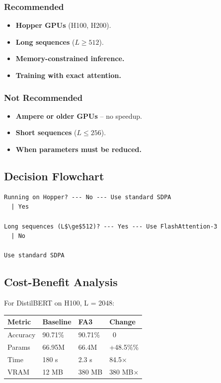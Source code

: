 \subsubsection{Recommended}
\begin{itemize}
\item \textbf{Hopper GPUs} (H100, H200).
\item \textbf{Long sequences} ($L \geq 512$).
\item \textbf{Memory-constrained inference.}
\item \textbf{Training with exact attention.}

\end{itemize}
\subsubsection{Not Recommended}
\begin{itemize}
\item \textbf{Ampere or older GPUs} -- no speedup.
\item \textbf{Short sequences} ($L \leq 256$).
\item \textbf{When parameters must be reduced.}

\end{itemize}
\subsection{Decision Flowchart}

\begin{lstlisting}
Running on Hopper? --- No --- Use standard SDPA
  | Yes
   
Long sequences (L$\ge$512)? --- Yes --- Use FlashAttention-3
  | No
   
Use standard SDPA
\end{lstlisting}

\subsection{Cost-Benefit Analysis}

For DistilBERT on H100, L = 2048:

\begin{table}[H]
\centering
\small
\begin{tabular}{llll}
\toprule
\textbf{Metric} & \textbf{Baseline} & \textbf{FA3} & \textbf{Change} \\
\midrule
Accuracy & 90.71\% & 90.71\% & ~0 \\
Params & 66.95M & 66.4M & +48.5\%\% \\
Time & 180 s & 2.3 s & 84.5$\times$ \\
VRAM & 12 MB & 380 MB & 380 MB$\times$ \\
\bottomrule
\end{tabular}
\end{table}

